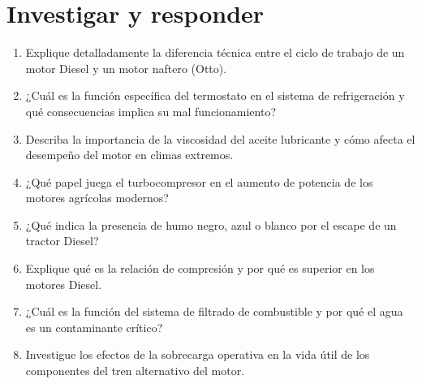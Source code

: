 \section*{\faPencil\space Investigar y responder}
\begin{enumerate}
	\item Explique detalladamente la diferencia técnica entre el ciclo de trabajo de
	      un motor Diesel y un motor naftero (Otto).
	\item ¿Cuál es la función específica del termostato en el sistema de
	      refrigeración y qué consecuencias implica su mal funcionamiento?
	\item Describa la importancia de la viscosidad del aceite lubricante y cómo
	      afecta el desempeño del motor en climas extremos.
	\item ¿Qué papel juega el turbocompresor en el aumento de potencia de los motores
	      agrícolas modernos?
	\item ¿Qué indica la presencia de humo negro, azul o blanco por el escape de un
	      tractor Diesel?
	\item Explique qué es la relación de compresión y por qué es superior en los
	      motores Diesel.
	\item ¿Cuál es la función del sistema de filtrado de combustible y por qué el
	      agua es un contaminante crítico?
	\item Investigue los efectos de la sobrecarga operativa en la vida útil de los
	      componentes del tren alternativo del motor.
\end{enumerate}


